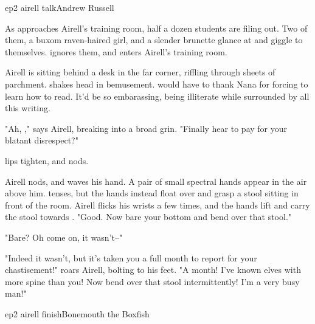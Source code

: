 \documentclass{book}
\begin{document}
\begin{childnode}{ep2 airell talk}{Andrew Russell}

    As \name{} approaches Airell's training room, half a dozen students are filing out. Two of them, a buxom raven-haired girl, and a slender brunette glance at \name{} and giggle to themselves.
    \name{} ignores them, and enters Airell's training room.

    Airell is sitting behind a desk in the far corner, riffling through sheets of parchment. \name{} shakes \hisher{} head in bemusement. \HeShe{} would have to thank Nana for forcing \himher{}
    to learn how to read. It'd be so embarassing, being illiterate while surrounded by all this writing.

    "Ah, \name{}," says Airell, breaking into a broad grin. "Finally hear to pay for your blatant disrespect?"

    \names{} lips tighten, and \heshe{} nods.

    Airell nods, and waves his hand. A pair of small spectral hands appear in the air above him. \name{} tenses, but the hands instead float over and grasp a stool sitting in front
    of the room. Airell flicks his wrists a few times, and the hands lift and carry the stool towards \name{}. "Good. Now bare your bottom and bend over that stool."

    "Bare? Oh come on, it wasn't--"

    "Indeed it wasn't, but it's taken you a full month to report for your chastisement!" roars Airell, bolting to his feet. "A month! I've known elves with more spine than you! Now bend over that
    stool intermittently! I'm a very busy man!"


\end{childnode}

\begin{childnode}{ep2 airell finish}{Bonemouth the Boxfish}



\end{childnode}
\end{document}
